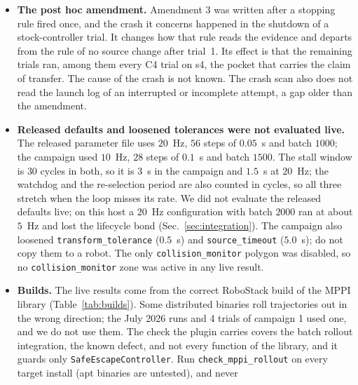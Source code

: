 \documentclass[journal]{IEEEtran}
\begin{document}
\begin{itemize}
  optimizer throws and the detector runs. Only when the server tolerates the failure (a tolerance of $-1$,
  or a positive tolerance that has not yet run out) is an escape path handed to MPPI, in the next cycle; under the campaign's tolerance of $0$ the server resets the controller in the
  same cycle. In either case MPPI cannot produce a command in the cycle that throws. No headless run and no campaign-2 trial threw, with reversing allowed.
\item \textbf{The post hoc amendment.} Amendment 3 was written after a stopping rule fired once, and the
  crash it concerns happened in the shutdown of a stock-controller trial. It changes how that rule reads the
  evidence and departs from the rule of no source change after trial~1. Its effect is that the remaining trials ran,
  among them every C4 trial on s4, the pocket that carries the claim of transfer.
  The cause of the crash is not known. The crash scan also does not read the launch log of an interrupted
  or incomplete attempt, a gap older than the amendment.
\item \textbf{Released defaults and loosened tolerances were not evaluated live.} The released
  parameter file uses $20$~Hz, $56$ steps of $0.05$~s and batch $1000$; the campaign used $10$~Hz,
  $28$ steps of $0.1$~s and batch $1500$. The stall window is $30$ cycles in both, so it is
  $3$~s in the campaign and $1.5$~s at $20$~Hz; the watchdog and the re-selection period are
  also counted in cycles, so all three stretch when the loop misses its rate. We did not evaluate
  the released defaults live; on this host a $20$~Hz configuration with batch $2000$ ran at about
  $5$~Hz and lost the lifecycle bond (Sec.~\ref{sec:integration}). The
  campaign also loosened \texttt{transform\_tolerance} ($0.5$~s) and \texttt{source\_timeout}
  ($5.0$~s); do not copy them to a robot. The only \texttt{collision\_monitor} polygon was
  disabled, so no \texttt{collision\_monitor} zone was active in any live result.
\item \textbf{Builds.} The live results come from the correct RoboStack build of the MPPI library
  (Table~\ref{tab:builds}). Some distributed binaries roll trajectories out in the wrong direction; the
  July 2026 runs and 4 trials of campaign 1 used one, and we do not use them. The check the plugin carries covers the batch
  rollout integration, the known defect, and not every function of the library, and it guards only \texttt{SafeEscapeController}. Run
  \texttt{check\_mppi\_rollout} on every target install (apt binaries are untested), and never

\end{itemize}
\end{document}
